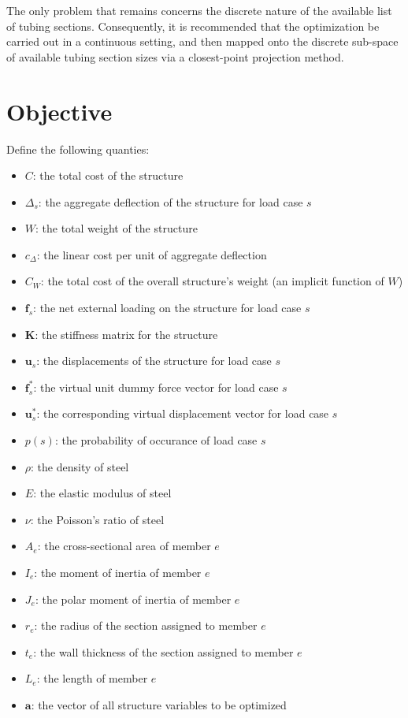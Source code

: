 \documentclass[12pt,a4paper,article]{memoir} %
\begin{document}
The only problem that remains concerns the discrete nature of the available list of tubing sections. Consequently, it is recommended that the optimization be carried out in a continuous setting, and then mapped onto the discrete sub-space of available tubing section sizes via a closest-point projection method.

\section{Objective}

Define the following quanties:
\begin{itemize}
        \item[] $C$: the total cost of the structure
        \item[] $\Delta_s$: the aggregate deflection of the structure for load case $s$
        \item[] $W$: the total weight of the structure
        \item[] $c_\Delta$: the linear cost per unit of aggregate deflection
        \item[] $C_W$: the total cost of the overall structure's weight (an implicit function of $W$)
        \item[] $\mathbf{f}_s$: the net external loading on the structure for load case $s$
        \item[] $\mathbf{K}$: the stiffness matrix for the structure
        \item[] $\mathbf{u}_s$: the displacements of the structure for load case $s$
        \item[] $\mathbf{f}^*_s$: the virtual unit dummy force vector for load case $s$
        \item[] $\mathbf{u}^*_s$: the corresponding virtual displacement vector for load case $s$
        \item[] $p(s)$: the probability of occurance of load case $s$
        \item[] $\rho$: the density of steel
        \item[] $E$: the elastic modulus of steel
        \item[] $\nu$: the Poisson's ratio of steel
        \item[] $A_e$: the cross-sectional area of member $e$
        \item[] $I_e$: the moment of inertia of member $e$
        \item[] $J_e$: the polar moment of inertia of member $e$
        \item[] $r_e$: the radius of the section assigned to member $e$
        \item[] $t_e$: the wall thickness of the section assigned to member $e$
        \item[] $L_e$: the length of member $e$
        \item[] $\mathbf{a}$: the vector of all structure variables to be optimized
\end{itemize}
\end{document}
